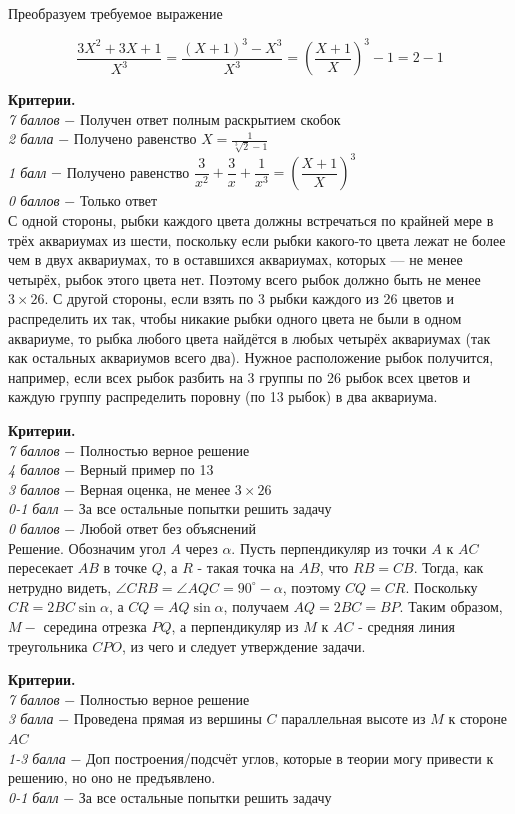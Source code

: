 Преобразуем требуемое выражение 

$$\dfrac{3X^2 + 3X + 1}{X^3} = \dfrac{(X+1)^3-X^3}{X^3} = \left(\dfrac{X+1}{X}\right)^3 - 1 = 2 - 1$$

\textbf{Критерии.} \\
\textit{7 баллов} $-$ Получен ответ полным раскрытием скобок\\
\textit{2 балла} $-$ Получено равенство  $X=\frac{1}{\sqrt[3]{2}-1}$\\
\textit{1 балл} $-$ Получено равенство $\dfrac{3}{x^2} + \dfrac{3}{x} + \dfrac{1}{x^3}=\left(\dfrac{X+1}{X}\right)^3$\\ 
\textit{0 баллов} $-$ Только ответ\\


 С одной стороны, рыбки каждого цвета должны встречаться по крайней мере в
трёх аквариумах из шести, поскольку если рыбки какого-то цвета лежат не более чем в двух
аквариумах, то в оставшихся аквариумах, которых — не менее четырёх, рыбок этого цвета нет.
Поэтому всего рыбок должно быть не менее $3\times26$.
С другой стороны, если взять по 3 рыбки каждого из 26 цветов и распределить их так,
чтобы никакие рыбки одного цвета не были в одном аквариуме, то рыбка любого цвета
найдётся в любых четырёх аквариумах (так как остальных аквариумов всего два). Нужное расположение
рыбок получится, например, если всех рыбок разбить на 3 группы по 26 рыбок
всех цветов и каждую группу распределить поровну (по 13 рыбок) в два аквариума. \par

\textbf{Критерии.} \\
\textit{7 баллов} $-$ Полностью верное решение\\
\textit{4 баллов} $-$ Верный пример по 13\\
\textit{3 баллов} $-$ Верная оценка, не менее $3\times26$\\
\textit{0-1 балл} $-$ За все остальные попытки решить задачу\\
\textit{0 баллов} $-$ Любой ответ без объяснений\\


Решение. Обозначим угол $A$ через $\alpha$. Пусть перпендикуляр из точки $A$ к $A C$ пересекает $A B$ в точке $Q$, а $R$ - такая точка на $A B$, что $R B=C B$. Тогда, как нетрудно видеть, $\angle C R B=\angle A Q C=90^{\circ}-\alpha$, поэтому $C Q=C R$. Поскольку $C R=2 B C \sin \alpha$, а $C Q=A Q \sin \alpha$, получаем $A Q=2 B C=B P$. Таким образом, $M-$ середина отрезка $P Q$, а перпендикуляр из $M$ к $A C$ - средняя линия треугольника $C P O$, из чего и следует утверждение задачи.

\textbf{Критерии.} \\
\textit{7 баллов} $-$ Полностью верное решение\\
\textit{3 балла} $-$ Проведена прямая из вершины $C$ параллельная высоте из $M$ к стороне $AC$\\
\textit{1-3 балла} $-$  Доп построения/подсчёт углов, которые в теории могу привести к решению, но оно не предъявлено.\\ 
\textit{0-1 балл} $-$ За все остальные попытки решить задачу\\

